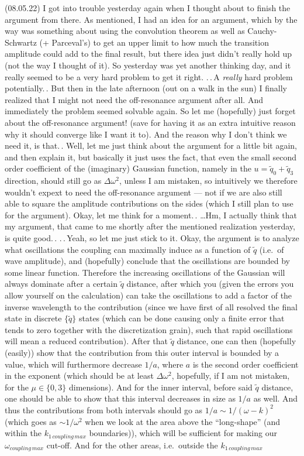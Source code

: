 \documentclass{report}
\begin{document}
(08.05.22) I got into trouble yesterday again when I thought about to finish the argument from there. As mentioned, I had an idea for an argument, which by the way was something about using the convolution theorem as well as Cauchy-Schwartz (+ Parceval's) to get an upper limit to how much the transition amplitude could add to the final result, but there idea just didn't really hold up (not the way I thought of it). So yesterday was yet another thinking day, and it really seemed to be a very hard problem to get it right. .\,.\,A \emph{really} hard problem potentially.\,. But then in the late afternoon (out on a walk in the sun) I finally realized that I might not need the off-resonance argument after all. And immediately the problem seemed solvable again. So let me (hopefully) just forget about the off-resonance argument! (save for having it as an extra intuitive reason why it should converge like I want it to). And the reason why I don't think we need it, is that.\,. Well, let me just think about the argument for a little bit again, and then explain it, but basically it just uses the fact, that even the small second order coefficient of the (imaginary) Gaussian function, namely in the $u = \tilde q_0 + \tilde q_3$ direction, should still go as $\Delta\omega^2$, unless I am mistaken, so intuitively we therefore wouldn't expext to need the off-resonance argument --- not if we are also still able to square the amplitude contributions on the sides (which I still plan to use for the argument). Okay, let me think for a moment.\,. \ldots Hm, I actually think that my argument, that came to me shortly after the mentioned realization yesterday, is quite good.\,. .\,.\,Yeah, so let me just stick to it. Okay, the argument is to analyze what oscillations the coupling can maximally induce as a function of $\tilde q$ (i.e.\ of wave amplitude), and (hopefully) conclude that the oscillations are bounded by some linear function. Therefore the increasing oscillations of the Gaussian will always dominate after a certain $\tilde q$ distance, after which you (given the errors you allow yourself on the calculation) can take the oscillations to add a factor of the inverse wavelength to the contribution (since we have first of all resolved the final state in discrete $\{\tilde q\}$ states (which can be done causing only a finite error that tends to zero together with the discretization grain), such that rapid oscillations will mean a reduced contribution). After that $\tilde q$ distance, one can then (hopefully (easily)) show that the contribution from this outer interval is bounded by a value, which will furthermore decrease $1/a$, where $a$ is the second order coefficient in the exponent (which should be at least $\Delta\omega^2$, hopefully, if I am not mistaken, for the $\mu\in\{0,3\}$ dimensions). And for the inner interval, before said $\tilde q$ distance, one should be able to show that this interval decreases in size as $1/a$ as well. And thus the contributions from both intervals should go as $1/a \sim 1/(\omega - k)^2$ (which goes as $\sim 1/\omega^2$ when we look at the area above the ``long-shape'' (and within the $k_{1\,coupling\,max}$ boundaries)), which will be sufficient for making our $\omega_{coupling\, max}$ cut-off. And for the other areas, i.e.\ outside the $k_{1\,coupling\,max}$ 
\end{document}
